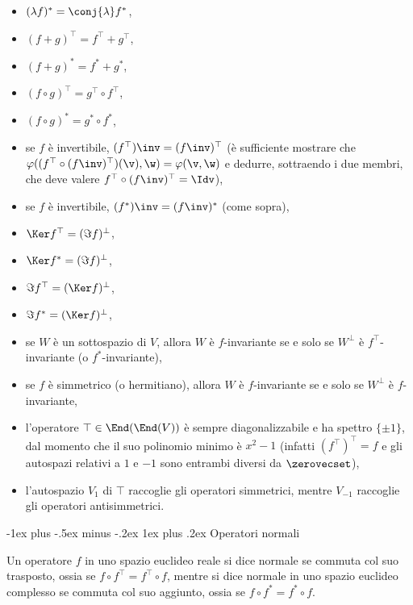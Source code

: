 \documentclass[10pt,landscape]{article}
\makeatletter
\renewcommand{\subsubsection}{\@startsection{subsubsection}{3}{0mm}%
	{-1ex plus -.5ex minus -.2ex}%
	{1ex plus .2ex}%
	{\normalfont\small\bfseries}}
\makeatother
\begin{document}
\begin{multicols}{3}
\begin{itemize}
			\item $(\lambda f)^* = \conj{\lambda} f^*$,
			\item $(f + g)^\top = f^\top + g^\top$,
			\item $(f + g)^* = f^* + g^*$,
			\item $(f \circ g)^\top = g^\top \circ f^\top$,
			\item $(f \circ g)^* = g^* \circ f^*$,
			\item se $f$ è invertibile, $(f^\top)\inv = (f\inv)^\top$ (è sufficiente mostrare che $\varphi((f^\top \circ (f\inv)^\top)(\v), \w) = \varphi(\v, \w)$ e dedurre,
			sottraendo i due membri, che deve valere $f^\top \circ (f\inv)^\top = \Idv$),
			\item se $f$ è invertibile, $(f^*)\inv = (f\inv)^*$ (come sopra),
			\item $\Ker f^\top = (\Im f)^\perp$,
			\item $\Ker f^* = (\Im f)^\perp$,
			\item $\Im f^\top = (\Ker f)^\perp$,
			\item $\Im f^* = (\Ker f)^\perp$,
			\item se $W$ è un sottospazio di $V$, allora $W$ è $f$-invariante se e solo
			se $W^\perp$ è $f^\top$-invariante (o $f^*$-invariante),
			\item se $f$ è simmetrico (o hermitiano), allora $W$ è $f$-invariante se e solo se $W^\perp$ è $f$-invariante,
			\item l'operatore $\top \in \End(\End(V))$ è sempre diagonalizzabile
			e ha spettro $\{\pm 1\}$, dal momento che il suo polinomio minimo è $x^2-1$ (infatti $(f^\top)^\top = f$ e gli autospazi relativi a $1$ e $-1$ sono entrambi diversi da $\zerovecset$),
			\item l'autospazio $V_1$ di $\top$ raccoglie gli operatori simmetrici, mentre
			$V_{-1}$ raccoglie gli operatori antisimmetrici.
		\end{itemize}

		\subsubsection{Operatori normali}
		
		Un operatore $f$ in uno spazio euclideo reale
		si dice normale se commuta col suo trasposto,
		ossia se $f \circ f^\top = f^\top \circ f$, mentre
		si dice normale in uno spazio euclideo complesso
		se commuta col suo aggiunto, ossia se $f \circ f^* = f^* \circ f$. \\ \vskip 0.05in
		

\end{multicols}
\end{document}
